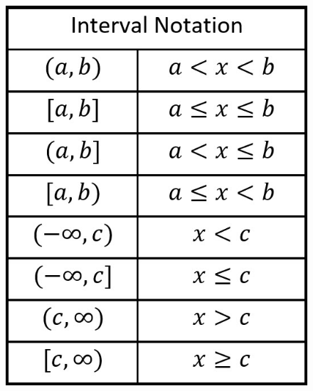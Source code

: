 \documentclass{article}
\begin{document}
\begin{figure}[h!]
\begin{minipage}{0.48\textwidth}
        \includegraphics[scale=0.5]{Interval_chart2.jpg}
        \label{fig:image2}
    \end{minipage}
\end{figure}

\end{document}

